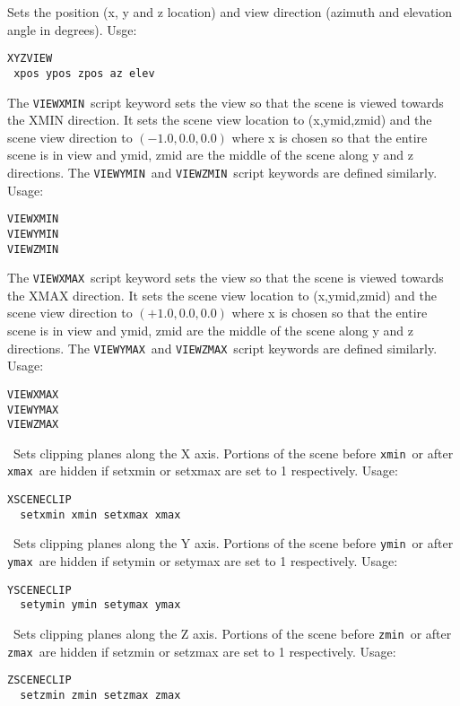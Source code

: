 \documentclass[11pt,twoside]{book}
\newcommand{\hitem}[1]{\item[{\bf #1} \hfill]}
\begin{document}
\hitem{XYZVIEW}Sets the position (x, y and z location) and view direction (azimuth and elevation angle in degrees).
Usge:
\begin{lstlisting}
XYZVIEW
 xpos ypos zpos az elev
\end{lstlisting}

\hitem{VIEWXMIN,VIEWYMIN,VIEWZMIN}The {\tt VIEWXMIN}\ script keyword sets the view so that the scene
is viewed towards the XMIN direction.  It sets
the scene view location to (x,ymid,zmid)
and the scene view direction to $(-1.0,0.0,0.0)$ where
x is chosen so that the entire scene is in view and ymid, zmid
are the middle of the scene along y and z directions.  The {\tt VIEWYMIN}\ and {\tt VIEWZMIN}\ script
keywords are defined similarly.  Usage:
\begin{lstlisting}
VIEWXMIN
VIEWYMIN
VIEWZMIN
\end{lstlisting}

\hitem{VIEWXMAX,VIEWYMAX,VIEWZMAX}The {\tt VIEWXMAX}\ script keyword sets the view so that the scene
is viewed towards the XMAX direction.  It sets
the scene view location to (x,ymid,zmid)
and the scene view direction to $(+1.0,0.0,0.0)$ where
x is chosen so that the entire scene is in view and ymid, zmid
are the middle of the scene along y and z directions.  The {\tt VIEWYMAX}\ and {\tt VIEWZMAX}\ script
keywords are defined similarly.  Usage:
\begin{lstlisting}
VIEWXMAX
VIEWYMAX
VIEWZMAX
\end{lstlisting}

\hitem{XSCENECLIP}\ Sets clipping planes along the X axis.
Portions of the scene before {\tt xmin}\
or after {\tt xmax}\ are hidden if setxmin or setxmax are set to 1 respectively.
Usage:
\begin{lstlisting}
XSCENECLIP
  setxmin xmin setxmax xmax
\end{lstlisting}

\hitem{YSCENECLIP}\ Sets clipping planes along the Y axis.
Portions of the scene before {\tt ymin}\
or after {\tt ymax}\ are hidden if setymin or setymax are set to 1 respectively.
Usage:
\begin{lstlisting}
YSCENECLIP
  setymin ymin setymax ymax
\end{lstlisting}

\hitem{ZSCENECLIP}\ Sets clipping planes along the Z axis.
Portions of the scene before {\tt zmin}\
or after {\tt zmax}\ are hidden if setzmin or setzmax are set to 1 respectively.
Usage:
\begin{lstlisting}
ZSCENECLIP
  setzmin zmin setzmax zmax
\end{lstlisting}
\end{document}
